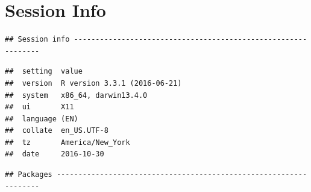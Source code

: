 \documentclass[]{book}
\begin{document}
\section{Session Info}\label{session-info}

\begin{verbatim}
## Session info --------------------------------------------------------------
\end{verbatim}

\begin{verbatim}
##  setting  value                       
##  version  R version 3.3.1 (2016-06-21)
##  system   x86_64, darwin13.4.0        
##  ui       X11                         
##  language (EN)                        
##  collate  en_US.UTF-8                 
##  tz       America/New_York            
##  date     2016-10-30
\end{verbatim}

\begin{verbatim}
## Packages ------------------------------------------------------------------
\end{verbatim}
\end{document}
